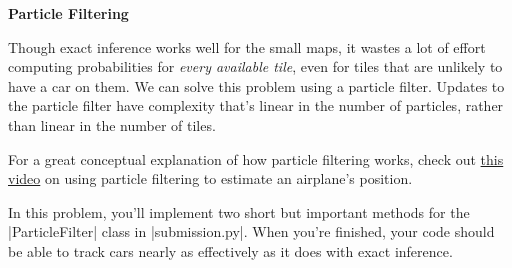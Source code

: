 \item {\bf Particle Filtering}

Though exact inference works well for the small maps, it wastes a lot of effort
computing probabilities for {\em every available tile}, even for tiles that are
unlikely to have a car on them.  We can solve this problem using a particle
filter. Updates to the particle filter have complexity that's linear in the
number of particles, rather than linear in the number of tiles.

For a great conceptual explanation of how particle filtering works, check out
\href{https://www.youtube.com/watch?v=aUkBa1zMKv4}{this video} on using particle 
filtering to estimate an airplane's position. 

In this problem, you'll implement two short but important methods for the
|ParticleFilter| class in |submission.py|. When you're finished, your code
should be able to track cars nearly as effectively as it does with exact
inference.

\begin{enumerate}

  

\end{enumerate}
